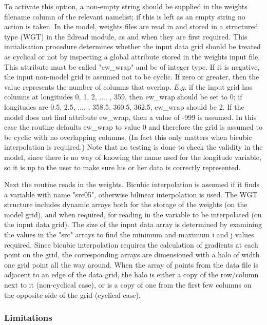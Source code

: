 To activate this option, a non-empty string should be supplied in the weights filename column 
of the relevant namelist; if this is left as an empty string no action is taken.
In the model, weights files are read in and stored in a structured type (WGT) in the fldread 
module, as and when they are first required.
This initialisation procedure determines whether the input data grid should be treated 
as cyclical or not by inspecting a global attribute stored in the weights input file.
This attribute must be called "ew\_wrap" and be of integer type.
If it is negative, the input non-model grid is assumed not to be cyclic.
If zero or greater, then the value represents the number of columns that overlap.
$E.g.$ if the input grid has columns at longitudes 0, 1, 2, .... , 359, then ew\_wrap should be set to 0;
if longitudes are 0.5, 2.5, .... , 358.5, 360.5, 362.5, ew\_wrap should be 2.
If the model does not find attribute ew\_wrap, then a value of -999 is assumed.
In this case the  routine defaults ew\_wrap to value 0 and therefore the grid 
is assumed to be cyclic with no overlapping columns.
(In fact this only matters when bicubic interpolation is required.)
Note that no testing is done to check the validity in the model, since there is no way 
of knowing the name used for the longitude variable,
so it is up to the user to make sure his or her data is correctly represented.

Next the routine reads in the weights.
Bicubic interpolation is assumed if it finds a variable with name "src05", otherwise 
bilinear interpolation is used. The WGT structure includes dynamic arrays both for 
the storage of the weights (on the model grid), and when required, for reading in 
the variable to be interpolated (on the input data grid).
The size of the input data array is determined by examining the values in the "src" 
arrays to find the minimum and maximum i and j values required.
Since bicubic interpolation requires the calculation of gradients at each point on the grid, 
the corresponding arrays are dimensioned with a halo of width one grid point all the way around.
When the array of points from the data file is adjacent to an edge of the data grid, 
the halo is either a copy of the row/column next to it (non-cyclical case), or is a copy 
of one from the first few columns on the opposite side of the grid (cyclical case).

\subsubsection{Limitations}
\label{SBC_iof_lim}

